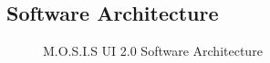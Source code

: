 \subsection{Software Architecture}
\begin{figure}
	\caption{M.O.S.I.S UI 2.0 Software Architecture}
\end{figure}